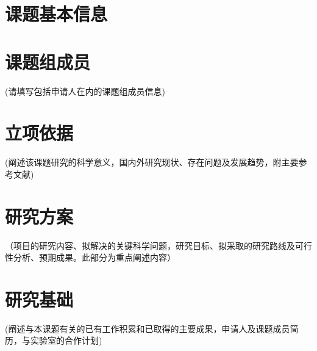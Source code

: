 \documentclass{sklcApplicant}
\begin{document}
\maketitle
\restoregeometry
\linespread{1.25}
\section{课题基本信息}
\BasicInformation

\section{课题组成员}

{\kaishu{} (请填写包括申请人在内的课题组成员信息)}
\vspace{-1.5em}

\vspace{-4em}
\section{立项依据}

{\kaishu{} (阐述该课题研究的科学意义，国内外研究现状、存在问题及发展趋势，附主要参考文献)}


\renewcommand\refname{\zihao{-3}\heiti 主要参考文献}


\section{研究方案}

{\kaishu{} （项目的研究内容、拟解决的关键科学问题，研究目标、拟采取的研究路线及可行性分析、预期成果。此部分为重点阐述内容）}






\section{研究基础}

{\kaishu{} (阐述与本课题有关的已有工作积累和已取得的主要成果，申请人及课题成员简历，与实验室的合作计划)}



\clearpage
\end{document}
